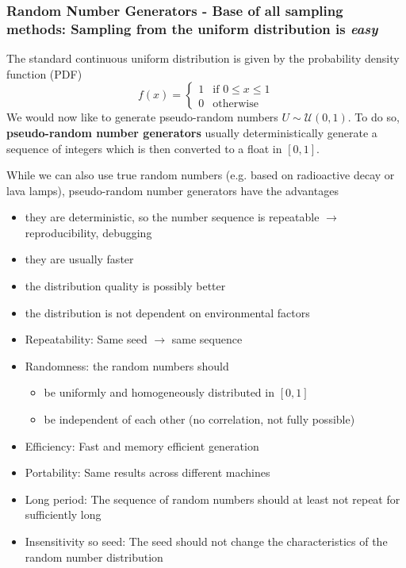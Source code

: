 \subsubsection{Random Number Generators - Base of all sampling methods: Sampling from the uniform distribution is \textit{easy}}
\label{sec:uniform}
The standard continuous uniform distribution is given by the probability density function (PDF)
\begin{equation}
    f(x) = \begin{cases}
        1 & \text{if } 0 \leq x \leq 1 \\
        0 & \text{otherwise}
    \end{cases}
\end{equation}
We would now like to generate pseudo-random numbers $U \sim \mathcal{U}(0,1)$. 
To do so, \textbf{pseudo-random number generators} usually deterministically generate a sequence
of integers which is then converted to a float in $[0,1]$.

While we can also use true random numbers (e.g. based on radioactive decay or lava lamps), pseudo-random number generators have
the advantages
\begin{itemize}
    \item they are deterministic, so the number sequence is repeatable $\rightarrow$ reproducibility, debugging
    \item they are usually faster
    \item the distribution quality is possibly better
    \item the distribution is not dependent on environmental factors
\end{itemize}

\begin{itemize}
    \item \textcolor{blue1}{Repeatability:} Same seed $\rightarrow$ same sequence
    \item \textcolor{blue1}{Randomness:} the random numbers should
    \begin{itemize}
        \item be uniformly and homogeneously distributed in $[0,1]$
        \item be independent of each other (no correlation, not fully possible)
    \end{itemize}
    \item \textcolor{blue1}{Efficiency:} Fast and memory efficient generation
    \item \textcolor{blue1}{Portability:} Same results across different machines
    \item \textcolor{blue1}{Long period:} The sequence of random numbers should at least not repeat for sufficiently long
    \item \textcolor{blue1}{Insensitivity so seed:} The seed should not change the characteristics of the random number distribution
\end{itemize}

